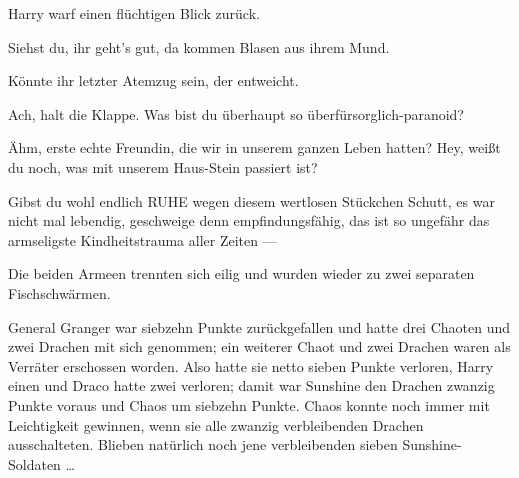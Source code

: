 Harry warf einen flüchtigen Blick zurück.

\begin{em}
Siehst du, ihr geht’s gut, da kommen Blasen aus ihrem Mund.

Könnte ihr letzter Atemzug sein, der entweicht.

Ach, halt die Klappe. Was bist du überhaupt so überfürsorglich-paranoid?

Ähm, erste echte Freundin, die wir in unserem ganzen Leben hatten? Hey, weißt du noch, was mit unserem Haus-Stein passiert ist?

Gibst du wohl endlich RUHE wegen diesem wertlosen Stückchen Schutt, es war nicht mal lebendig, geschweige denn empfindungsfähig, das ist so ungefähr das armseligste Kindheitstrauma aller Zeiten —
\end{em}

Die beiden Armeen trennten sich eilig und wurden wieder zu zwei separaten Fischschwärmen.

General Granger war siebzehn Punkte zurückgefallen und hatte drei Chaoten und zwei Drachen mit sich genommen; ein weiterer Chaot und zwei Drachen waren als Verräter erschossen worden. Also hatte sie netto sieben Punkte verloren, Harry einen und Draco hatte zwei verloren; damit war Sunshine den Drachen zwanzig Punkte voraus und Chaos um siebzehn Punkte. Chaos konnte noch immer mit Leichtigkeit gewinnen, wenn sie alle zwanzig verbleibenden Drachen ausschalteten. Blieben natürlich noch jene verbleibenden sieben Sunshine-Soldaten …


